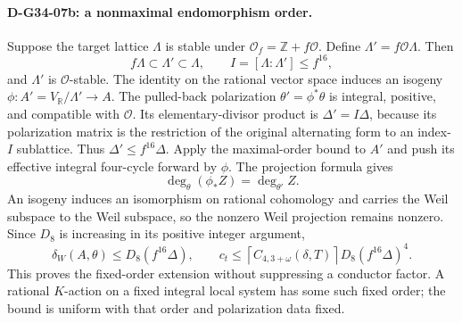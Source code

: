 \paragraph{D-G34-07b: a nonmaximal endomorphism order.}
Suppose the target lattice \(\Lambda\) is stable under
\(\mathcal O_f=\mathbb Z+f\mathcal O\).  Define
\(\Lambda'=f\mathcal O\Lambda\).  Then
\[
                  f\Lambda\subset\Lambda'\subset\Lambda,
      \qquad I=[\Lambda:\Lambda']\le f^{16},
\]
and \(\Lambda'\) is \(\mathcal O\)-stable.  The identity on the rational
vector space induces an isogeny
\(\phi:A'=V_{\mathbb R}/\Lambda'\to A\).
The pulled-back polarization \(\theta'=\phi^*\theta\) is integral,
positive, and compatible with \(\mathcal O\).  Its elementary-divisor
product is
\(\Delta'=I\Delta\), because its polarization matrix is the restriction
of the original alternating form to an index-\(I\) sublattice.  Thus
\(\Delta'\le f^{16}\Delta\).
Apply the maximal-order bound to \(A'\) and push its effective integral
four-cycle forward by \(\phi\).  The projection formula gives
\[
                 \deg_\theta(\phi_*Z)=\deg_{\theta'}Z.
\]
An isogeny induces an isomorphism on rational cohomology and carries the
Weil subspace to the Weil subspace, so the nonzero Weil projection remains
nonzero.  Since \(D_8\) is increasing in its positive integer argument,
\[
 \boxed{\delta_W(A,\theta)\le D_8(f^{16}\Delta),\qquad
 c_t\le\left\lceil C_{4,3+\omega}(\delta,T)\right\rceil
                         D_8(f^{16}\Delta)^4.}
\]
This proves the fixed-order extension without suppressing a conductor factor.
A rational \(K\)-action on a fixed integral local system has some such fixed
order; the bound is uniform with that order and polarization data fixed.
